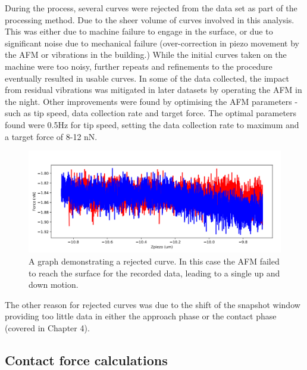  During the process, several curves were rejected from the data set as part of the processing method. Due to the sheer volume of curves involved in this analysis.  This was either due to machine failure to engage in the surface, or due to significant noise due to mechanical failure (over-correction in piezo movement by the AFM or vibrations in the building.) While the initial curves taken on the machine were too noisy, further repeats and refinements to the procedure eventually resulted in usable curves. In some of the data collected, the impact from residual vibrations was mitigated in later datasets by operating the AFM in the night. Other improvements were found by optimising the AFM parameters  - such as tip speed, data collection rate and target force. The optimal parameters found were 0.5Hz for tip speed, setting the data collection rate to maximum and a target force of 8-12 nN. 

\begin{figure}
    \centering
    \includegraphics[width=0.65\linewidth]{chapter5/miss_error.png}
    \caption{A graph demonstrating a rejected curve. In this case the AFM failed to reach the surface for the recorded data, leading to a single up and down motion.}
    \label{fig:miss-error}
\end{figure}

The other reason for rejected curves was due to the shift of the snapshot window providing too little data in either the approach phase or the contact phase (covered in Chapter 4). 

\subsection{Contact force calculations}

